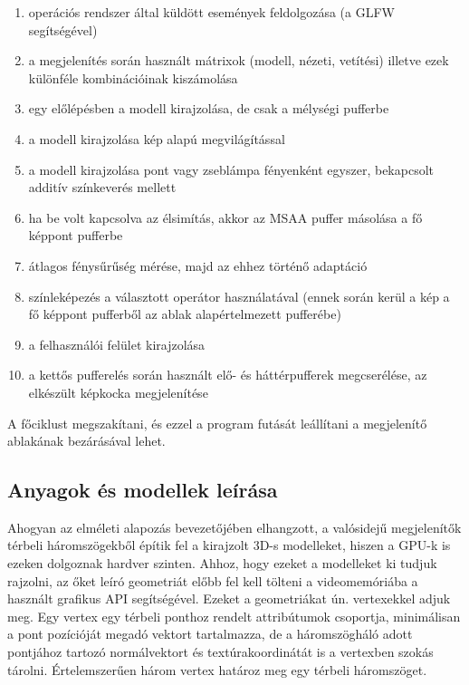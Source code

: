 \begin{enumerate}[noitemsep]
  \item operációs rendszer által küldött események feldolgozása (a GLFW segítségével)
  \item a megjelenítés során használt mátrixok (modell, nézeti, vetítési) illetve ezek különféle kombinációinak kiszámolása
  \item egy előlépésben a modell kirajzolása, de csak a mélységi pufferbe
  \item a modell kirajzolása kép alapú megvilágítással
  \item a modell kirajzolása pont vagy zseblámpa fényenként egyszer, bekapcsolt additív színkeverés mellett
  \item ha be volt kapcsolva az élsimítás, akkor az MSAA puffer másolása a fő képpont pufferbe
  \item átlagos fénysűrűség mérése, majd az ehhez történő adaptáció
  \item színleképezés a választott operátor használatával (ennek során kerül a kép a fő képpont pufferből az ablak alapértelmezett pufferébe)
  \item a felhasználói felület kirajzolása
  \item a kettős pufferelés során használt elő- és háttérpufferek megcserélése, az elkészült képkocka megjelenítése
\end{enumerate}

A főciklust megszakítani, és ezzel a program futását leállítani a megjelenítő ablakának bezárásával lehet.

\subsection{Anyagok és modellek leírása}

Ahogyan az elméleti alapozás bevezetőjében elhangzott, a valósidejű megjelenítők térbeli háromszögekből építik fel a kirajzolt 3D-s modelleket, hiszen a GPU-k is ezeken dolgoznak hardver szinten. Ahhoz, hogy ezeket a modelleket ki tudjuk rajzolni, az őket leíró geometriát előbb fel kell tölteni a videomemóriába a használt grafikus API segítségével. Ezeket a geometriákat ún. vertexekkel adjuk meg. Egy vertex egy térbeli ponthoz rendelt attribútumok csoportja, minimálisan a pont pozícióját megadó vektort tartalmazza, de a háromszögháló adott pontjához tartozó normálvektort és textúrakoordinátát is a vertexben szokás tárolni. Értelemszerűen három vertex határoz meg egy térbeli háromszöget.

